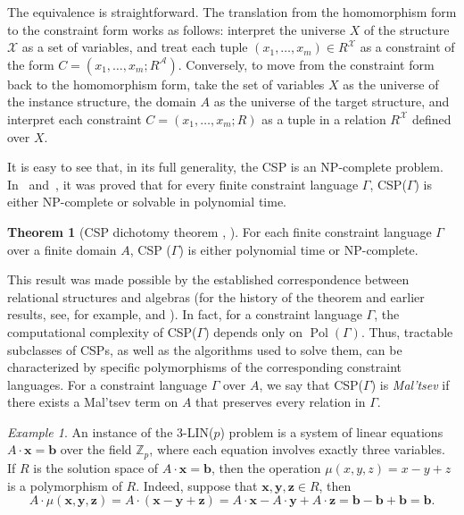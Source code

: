 \documentclass{article}
\theoremstyle{definition}
\theoremstyle{theorem}
\newtheorem{thm}{Theorem}
\theoremstyle{theorem}
\theoremstyle{remark}
\theoremstyle{remark}
\theoremstyle{example}
\newtheorem{ex}{Example}
\theoremstyle{notation}
\theoremstyle{theorem}
\begin{document}
The equivalence is straightforward. The translation from the homomorphism form to the constraint form works as follows: interpret the universe $X$ of the structure $\mathcal{X}$ as a set of variables, and treat each tuple $(x_1, \ldots, x_m) \in R^\mathcal{X}$ as a constraint of the form $C = (x_1, \ldots, x_m; R^\mathcal{A})$. Conversely, to move from the constraint form back to the homomorphism form, take the set of variables $X$ as the universe of the instance structure, the domain $A$ as the universe of the target structure, and interpret each constraint $C = (x_1, \ldots, x_m; R)$ as a tuple in a relation $R^\mathcal{X}$ defined over $X$.

It is easy to see that, in its full generality, the CSP is an NP-complete problem. In~\cite{8104069} and~\cite{10.1145/3402029}, it was proved that for every finite constraint language $\Gamma$, CSP($\Gamma$) is either NP-complete or solvable in polynomial time.

\begin{thm}[CSP dichotomy theorem \cite{8104069}, \cite{10.1145/3402029}]
    For each finite constraint language $\Gamma$ over a finite domain $A$, CSP ($\Gamma$) is either polynomial time or NP-complete.    
\end{thm}
This result was made possible by the established correspondence between relational structures and algebras (for the history of the theorem and earlier results, see, for example, \cite{barto_et_al} and \cite{1}). In fact, for a constraint language $\Gamma$, the computational complexity of CSP($\Gamma$) depends only on $\operatorname{Pol}(\Gamma)$. Thus, tractable subclasses of CSPs, as well as the algorithms used to solve them, can be characterized by specific polymorphisms of the corresponding constraint languages. For a constraint language $\Gamma$ over $A$, we say that CSP($\Gamma$) is \emph{Mal'tsev} if there exists a Mal'tsev term on $A$ that preserves every relation in $\Gamma$.

\begin{ex}
    An instance of the $3$-LIN($p$) problem is a system of linear equations $A \cdot \bm{x} = \bm{b}$ over the field $\mathbb{Z}_p$, where each equation involves exactly three variables. If $R$ is the solution space of $A \cdot \bm{x} = \bm{b}$, then the operation $\mu(x, y, z) = x - y + z$ is a polymorphism of $R$. Indeed, suppose that $\bm{x}, \bm{y}, \bm{z} \in R$, then
$$
A \cdot \mu(\bm{x}, \bm{y}, \bm{z}) = A \cdot (\bm{x} - \bm{y} + \bm{z}) = A \cdot \bm{x} - A \cdot \bm{y} + A \cdot \bm{z} = \bm{b} - \bm{b} + \bm{b} = \bm{b}.
$$
\end{ex}
\end{document}
